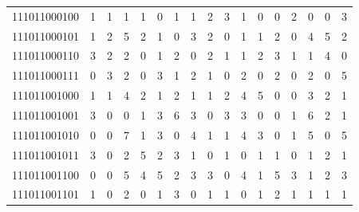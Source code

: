 \documentclass[10pt,a4paper]{article}
\begin{document}
\begin{longtable}{ |c|c|c|c|c|c|c|c|c|c|c|c|c|c|c|c|c| }
    111011000100              & 1                            & 1                                & 1                            & 1                              & 0   & 1   & 1   & 2   & 3   & 1   & 0   & 0   & 2   & 0   & 0   & 3   \\
    111011000101              & 1                            & 2                                & 5                            & 2                              & 1   & 0   & 3   & 2   & 0   & 1   & 1   & 2   & 0   & 4   & 5   & 2   \\
    111011000110              & 3                            & 2                                & 2                            & 0                              & 1   & 2   & 0   & 2   & 1   & 1   & 2   & 3   & 1   & 1   & 4   & 0   \\
    111011000111              & 0                            & 3                                & 2                            & 0                              & 3   & 1   & 2   & 1   & 0   & 2   & 0   & 2   & 0   & 2   & 0   & 5   \\
    111011001000              & 1                            & 1                                & 4                            & 2                              & 1   & 2   & 1   & 1   & 2   & 4   & 5   & 0   & 0   & 3   & 2   & 1   \\
    111011001001              & 3                            & 0                                & 0                            & 1                              & 3   & 6   & 3   & 0   & 3   & 3   & 0   & 0   & 1   & 6   & 2   & 1   \\
    111011001010              & 0                            & 0                                & 7                            & 1                              & 3   & 0   & 4   & 1   & 1   & 4   & 3   & 0   & 1   & 5   & 0   & 5   \\
    111011001011              & 3                            & 0                                & 2                            & 5                              & 2   & 3   & 1   & 0   & 1   & 0   & 1   & 1   & 0   & 1   & 2   & 1   \\
    111011001100              & 0                            & 0                                & 5                            & 4                              & 5   & 2   & 3   & 3   & 0   & 4   & 1   & 5   & 3   & 1   & 2   & 3   \\
    111011001101              & 1                            & 0                                & 2                            & 0                              & 1   & 3   & 0   & 1   & 1   & 0   & 1   & 2   & 1   & 1   & 1   & 1   \\

\end{longtable}
\end{document}
